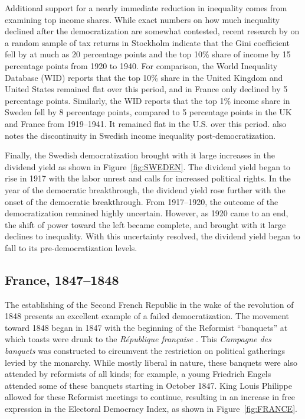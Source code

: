 Additional support for a nearly immediate reduction in inequality comes from examining top income shares. While exact numbers on how much inequality declined after the democratization are somewhat contested, recent research by \cite*{Bengtsson2021} on a random sample of tax returns in Stockholm indicate that the Gini coefficient fell by at much as 20 percentage points and the top 10\% share of income by 15 percentage points from 1920 to 1940. For comparison, the World Inequality Database (WID) reports that the top 10\% share in the United Kingdom and United States remained flat over this period, and in France only declined by 5 percentage points.  Similarly, the WID reports that the top 1\% income share in Sweden fell by 8 percentage points, compared to 5 percentage points in the UK and France from 1919--1941. It remained flat in the U.S. over this period. \cite{Bengtsson2019} also notes the discontinuity in Swedish income inequality post-democratization.

Finally, the Swedish democratization brought with it large increases in the dividend yield as shown in Figure~\ref{fig:SWEDEN}. The dividend yield began to rise in 1917 with the labor unrest and calls for increased political rights. In the year of the democratic breakthrough, the dividend yield rose further with the onset of the democratic breakthrough. From 1917--1920, the outcome of the democratization remained highly uncertain. However, as 1920 came to an end, the shift of power toward the left became complete, and brought with it large declines to inequality. With this uncertainty resolved, the dividend yield began to fall to its pre-democratization levels.

\subsection{France, 1847--1848}\label{section:FRANCE}

The establishing of the Second French Republic in the wake of the revolution of 1848 presents an excellent example of a failed democratization.  The movement toward 1848 began in 1847 with the beginning of the Reformist ``banquets'' at which toasts were drunk to the \textit{R\'{e}publique fran\c{c}aise} \citep{Marx1850}. This \textit{Campagne des banquets} was constructed to circumvent the restriction on political gatherings levied by the monarchy. While mostly liberal in nature, these banquets were also attended by reformists of all kinds; for example, a young Friedrich Engels attended some of these banquets starting in October 1847. King Louis Philippe allowed for these Reformist meetings to continue, resulting in an increase in free expression in the Electoral Democracy Index, as shown in Figure~\ref{fig:FRANCE}.  

